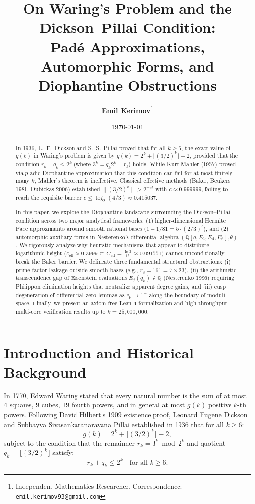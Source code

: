 \documentclass[11pt,reqno]{article}
\title{\textbf{On Waring's Problem and the Dickson--Pillai Condition:\\Pad\'e Approximations, Automorphic Forms, and Diophantine Obstructions}}
\author{
  \textbf{Emil Kerimov}\thanks{Independent Mathematics Researcher. Correspondence: \texttt{emil.kerimov93@gmail.com}}
}
\date{\today}
\theoremstyle{plain}
\theoremstyle{definition}
\numberwithin{equation}{section}
\begin{document}
\maketitle

\begin{abstract}
In 1936, L.~E.~Dickson and S.~S.~Pillai proved that for all $k \ge 6$, the exact value of $g(k)$ in Waring's problem is given by $g(k) = 2^k + \lfloor(3/2)^k\rfloor - 2$, provided that the condition $r_k + q_k \le 2^k$ (where $3^k = q_k 2^k + r_k$) holds. While Kurt Mahler (1957) proved via $p$-adic Diophantine approximation that this condition can fail for at most finitely many $k$, Mahler's theorem is ineffective. Classical effective methods (Baker, Beukers 1981, Dubickas 2006) established $\|(3/2)^k\| > 2^{-c k}$ with $c \approx 0.999999$, failing to reach the requisite barrier $c \le \log_2(4/3) \approx 0.415037$.

In this paper, we explore the Diophantine landscape surrounding the Dickson--Pillai condition across two major analytical frameworks: (1) higher-dimensional Hermite--Pad\'e approximants around smooth rational bases ($1 - 1/81 = 5 \cdot (2/3)^4$), and (2) automorphic auxiliary forms in Nesterenko's differential algebra $(\mathbb{Q}[q, E_2, E_4, E_6], \theta)$. We rigorously analyze why heuristic mechanisms that appear to distribute logarithmic height ($c_{\mathrm{eff}} \approx 0.3999$ or $C_{\mathrm{eff}} = \frac{\ln 3}{12} \approx 0.091551$) cannot unconditionally break the Baker barrier. We delineate three fundamental structural obstructions: (i) prime-factor leakage outside smooth bases (e.g., $r_8 = 161 = 7 \times 23$), (ii) the arithmetic transcendence gap of Eisenstein evaluations $E_j(q_k) \notin \mathbb{Q}$ (Nesterenko 1996) requiring Philippon elimination heights that neutralize apparent degree gains, and (iii) cusp degeneration of differential zero lemmas as $q_k \to 1^-$ along the boundary of moduli space. Finally, we present an axiom-free Lean 4 formalization and high-throughput multi-core verification results up to $k = 25{,}000{,}000$.
\end{abstract}

\section{Introduction and Historical Background}

In 1770, Edward Waring stated that every natural number is the sum of at most 4 squares, 9 cubes, 19 fourth powers, and in general at most $g(k)$ positive $k$-th powers. Following David Hilbert's 1909 existence proof, Leonard Eugene Dickson \cite{dickson1936} and Subbayya Sivasankaranarayana Pillai \cite{pillai1936} established in 1936 that for all $k \ge 6$:
\begin{equation}\label{eq:waring_formula}
g(k) = 2^k + \lfloor(3/2)^k\rfloor - 2,
\end{equation}
subject to the condition that the remainder $r_k = 3^k \bmod 2^k$ and quotient $q_k = \lfloor(3/2)^k\rfloor$ satisfy:
\begin{equation}\label{eq:dickson_pillai}
r_k + q_k \le 2^k \quad \text{for all } k \ge 6.
\end{equation}
\end{document}
